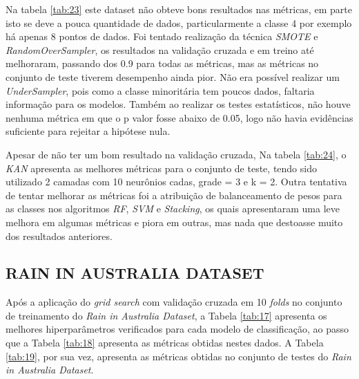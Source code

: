 \documentclass[journal]{IEEEtran}
\begin{document}
Na tabela \ref{tab:23} este dataset não obteve bons resultados nas métricas, em parte isto se deve a pouca quantidade de dados, particularmente a classe 4 por exemplo há apenas 8 pontos de dados. Foi tentado realização da técnica \textit{SMOTE} e \textit{RandomOverSampler}, os resultados na validação cruzada e em treino até melhoraram, passando dos 0.9 para todas as métricas, mas as métricas no conjunto de teste tiverem desempenho ainda pior. Não era possível realizar um \textit{UnderSampler}, pois como a classe minoritária tem poucos dados, faltaria informação para os modelos. Também ao realizar os testes estatísticos, não houve nenhuma métrica em que o p valor fosse abaixo de 0.05, logo não havia evidências suficiente para rejeitar a hipótese nula.

Apesar de não ter um bom resultado na validação cruzada, Na tabela \ref{tab:24}, o \textit{KAN} apresenta as melhores métricas para o conjunto de teste, tendo sido utilizado 2 camadas com 10 neurônios cadas, grade = 3 e k = 2. Outra tentativa de tentar melhorar as métricas foi a atribuição de balanceamento de pesos para as classes nos algoritmos \textit{RF},  \textit{SVM} e \textit{Stacking}, os quais apresentaram uma leve melhora em algumas métricas e piora em outras, mas nada que destoasse muito dos resultados anteriores.




\subsection{RAIN IN AUSTRALIA DATASET}

Após a aplicação do \textit{grid search} com validação cruzada em 10 \textit{folds} no conjunto de treinamento do \textit{Rain in Australia Dataset}, a Tabela \ref{tab:17} apresenta os melhores hiperparâmetros verificados para cada modelo de classificação, ao passo que a Tabela \ref{tab:18} apresenta as métricas obtidas nestes dados. A Tabela \ref{tab:19}, por sua vez, apresenta as métricas obtidas no conjunto de testes do \textit{Rain in Australia Dataset}.
\end{document}
